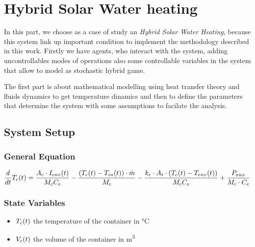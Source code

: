 
\chapter{Hybrid Solar Water heating}
\label{ch:proposal}

In this part, we choose as a case of study an \emph{Hybrid Solar Water
Heating}, because this system link up important condition to implement the
methodology described in this work. Firstly we have agents, who interact with 
the system, adding uncontrollables modes of operations also some controllable
variables in the system that allow to model as stochastic hybrid game.

The first part is about mathematical modelling using heat transfer
 theory and fluids dynamics to get temperature dinamics and then 
 to define the parameters that determine the system with some
 assumptions to facilate the analysis.

\section{System Setup}



\subsection{General Equation}

\begin{equation}
  \frac{d}{dt}T_{c}(t) = \frac{A_c\cdot I_{env}(t)}{M_{c}C_e}
  - \frac{(T_{c}(t)-T_{in}(t))\cdot\dot{m}}{M_{c}} - 
  \frac{k_c\cdot A_t\cdot(T_{c}(t)-T_{env}(t))}{M_{c}C_e} 
  + \frac{P_{aux}}{M_{c}\cdot C_e}        
\end{equation}

\subsection{State Variables}

\begin{itemize}
\item
  $T_{c}(t)$ the temperature of the container in \si{\degreeCelsius}
\item
  $V_{c}(t)$ the volume of the container in \si{\metre^3}

\end{itemize}

